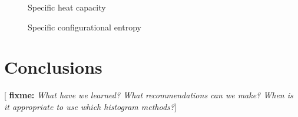 \documentclass[11pt]{article}
\newcommand{\red}[1]{{\bf \color{red} #1}}
\newcommand{\fixme}[1]{[\red{fixme:} \emph{#1}]}
\begin{document}
\begin{figure}[H]
  \centering
  \caption[Heat capacity]{Specific heat capacity}
  \label{fig:cv_error}
\end{figure}

\begin{figure}[H]
  \centering
  \caption[Configurational entropy]{Specific configurational
    entropy}
  \label{fig:s_error}
\end{figure}


\section{Conclusions}
\label{sec:conclusions}

\fixme{What have we learned? What recommendations can we make? When is
  it appropriate to use which histogram methods?}



\end{document}
